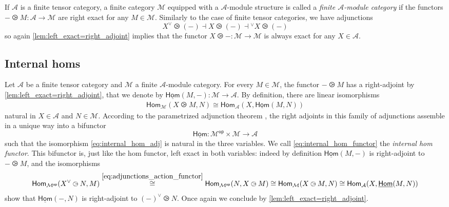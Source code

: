 \documentclass[11pt]{article}
\theoremstyle{definition}
\begin{document}
If $\mathcal{A}$ is a finite tensor category, a finite category $\mathcal{M}$ equipped with a  $\mathcal{A}$-module structure is called a \emph{finite $\mathcal{A}$-module category} if the functors $- \ogreaterthan M : \mathcal{A} \longrightarrow \mathcal{M}$  are right exact for any $M \in \mathcal{M}$. Similarly to the case of finite tensor categories, we have adjunctions
\begin{equation}\label{eq:adjunctions_action_functor}
X^\vee \ogreaterthan (-)\dashv X\ogreaterthan (-)\dashv {}^\vee X\ogreaterthan(-)
\end{equation} 
so again  \cref{lem:left_exact=right_adjoint} implies that the functor $X \ogreaterthan - : \mathcal{M} \longrightarrow \mathcal{M}$ is always exact for any $X \in \mathcal{A}$.

\subsection{Internal homs}\label{subsec:internal_homs}

Let $\mathcal{A}$ be a finite tensor category and $\mathcal{M}$ a finite $\mathcal{A}$-module category. For every $M \in \mathcal{M}$, the functor $-	 \ogreaterthan M$ has a right-adjoint by \cref{lem:left_exact=right_adjoint}, that we denote by $\underline{\mathsf{Hom}}(M,-): \mathcal{M} \longrightarrow \mathcal{A}$. By definition, there are linear isomorphisms
\begin{align}\label{eq:internal_hom_adj}
\mathsf{Hom}_{\mathcal{M}}(X \ogreaterthan M,N) \cong \mathsf{Hom}_\mathcal{A} (X, \underline{\mathsf{Hom}}(M,N)) 
\end{align}
natural in $X \in \mathcal{A}$ and $N \in \mathcal{M}$.
According to the parametrized adjunction theorem \cite[Theorem IV.7.3]{maclane}, the right adjoints in this family of adjunctions assemble in a unique way into a bifunctor
\begin{equation}\label{eq:internal_hom_functor}
\underline{\mathsf{Hom}}:\mathcal{M}^{\mathsf{op}} \times \mathcal{M} \longrightarrow \mathcal{A}
\end{equation}
such that the isomorphism \eqref{eq:internal_hom_adj} is natural in the three variables. We call \eqref{eq:internal_hom_functor} the \emph{internal hom functor}. This bifunctor is, just like the hom functor,  left exact in both variables: indeed by definition $\underline{\mathsf{Hom}}(M,-)$ is right-adjoint to $- \ogreaterthan M$, and the isomorphisms
\begin{align*}
\mathsf{Hom}_{\mathcal{M}^\mathsf{op}}(X^\vee \ogreaterthan N,M) \overset{\eqref{eq:adjunctions_action_functor}}  {\cong} \mathsf{Hom}_{\mathcal{M}^\mathsf{op}}( N,X \ogreaterthan M) \cong  \mathsf{Hom}_{\mathcal{M}}( X \ogreaterthan M, N)  \cong \mathsf{Hom}_\mathcal{A} (X, \underline{\mathsf{Hom}}(M,N)) 
\end{align*}
show that  $\underline{\mathsf{Hom}}(-,N)$ is right-adjoint to $(-)^\vee \ogreaterthan N$. Once again we conclude  by \cref{lem:left_exact=right_adjoint}. 
\end{document}
